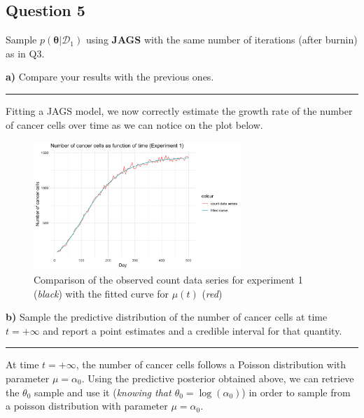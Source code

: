 \subsection*{Question 5}

Sample $p(\bm{\theta}|\mathcal{D}_1)$ using \textbf{JAGS} with the same number of iterations (after burnin) as in Q3.

\textbf{a)} Compare your results with the previous ones.

\begin{center}\rule{6cm}{0.4pt}\end{center}

Fitting a JAGS model, we now correctly estimate the growth rate of the number of cancer cells over time as we can notice on the plot below.

\begin{figure}[H]
	\centering
	\includegraphics[width=0.7\textwidth]{figures/jags/jags_fitted_curve.png}
	\caption{Comparison of the observed count data series for experiment 1 (\textit{black}) with the fitted curve for $\mu(t)$ (\textit{red})}
	\label{fig:jags-fitted-curve}
\end{figure}

\textbf{b)} Sample the predictive distribution of the number of cancer cells at time $t = +\infty$ and report a point estimates and a credible interval for that quantity.

\begin{center}\rule{6cm}{0.4pt}\end{center}

At time $t = +\infty$, the number of cancer cells follows a Poisson distribution with parameter $\mu = \alpha_0$. Using the predictive posterior obtained above, we can retrieve the $\theta_0$ sample and use it (\textit{knowing that $\theta_0 = \log(\alpha_0)$}) in order to sample from a poisson distribution with parameter $\mu = \alpha_0$. 

